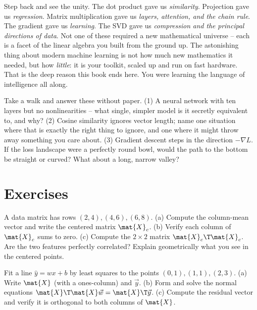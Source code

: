 \begin{aestheticbox}
Step back and see the unity. The dot product gave us \emph{similarity}. Projection gave us
\emph{regression}. Matrix multiplication gave us \emph{layers, attention, and the chain
rule}. The gradient gave us \emph{learning}. The SVD gave us \emph{compression and the
principal directions of data}. Not one of these required a new mathematical universe --
each is a facet of the linear algebra you built from the ground up. The astonishing thing
about modern machine learning is not how much new mathematics it needed, but how
\emph{little}: it is your toolkit, scaled up and run on fast hardware. That is the deep
reason this book ends here. You were learning the language of intelligence all along.
\end{aestheticbox}

\begin{walkbox}
Take a walk and answer these without paper. (1) A neural network with ten layers but no
nonlinearities -- what single, simpler model is it secretly equivalent to, and why?
(2) Cosine similarity ignores vector length; name one situation where that is exactly the
right thing to ignore, and one where it might throw away something you care about.
(3) Gradient descent steps in the direction $-\nabla L$. If the loss landscape were a
perfectly round bowl, would the path to the bottom be straight or curved? What about a
long, narrow valley?
\end{walkbox}

\section{Exercises}
\label{ch34:exercises}

\begin{exercise}
A data matrix has rows $(2,4),(4,6),(6,8)$.
(a) Compute the column-mean vector and write the centered matrix $\mat{X}_c$.
(b) Verify each column of $\mat{X}_c$ sums to zero.
(c) Compute the $2\times2$ matrix $\mat{X}_c\T\mat{X}_c$. Are the two features perfectly
correlated? Explain geometrically what you see in the centered points.
\end{exercise}

\begin{exercise}
Fit a line $\hat y = wx+b$ by least squares to the points $(0,1),(1,1),(2,3)$.
(a) Write $\mat{X}$ (with a ones-column) and $\vec{y}$.
(b) Form and solve the normal equations $\mat{X}\T\mat{X}\vec{w}=\mat{X}\T\vec{y}$.
(c) Compute the residual vector and verify it is orthogonal to both columns of $\mat{X}$.
\end{exercise}

